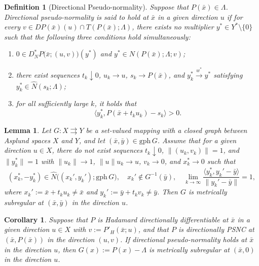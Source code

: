 \documentclass[10pt,a4paper]{amsart}
\newtheorem{lemma}{Lemma}
\newtheorem{definition}{Definition}
\newtheorem{corollary}{Corollary}
\begin{document}
\begin{definition}[Directional Pseudo-normality] \label{defn:directional_pseudo_normality} 
    Suppose that $P(\bar{x}) \in \Lambda$. Directional pseudo-normality is said to hold at $\bar{x}$ in a given direction $u$ if for every $v \in DP(\bar{x})(u) \cap T(P(\bar{x}); \Lambda)$,  there exists no multiplier $y^* \in Y^* \setminus \{0\}$ such that the following three conditions hold simultaneously:
    \begin{enumerate}
        \item[(i)] $0 \in D_N^* P\big(\bar{x}; (u,v)\big)(y^*)$ and $y^* \in N(P(\bar{x}); \Lambda; v)$;
        \item[(ii)] there exist sequences $t_k \downarrow 0$, $u_k \to u$, $s_k \to P(\bar{x})$, and $y_k^* \xrightarrow{w^*} y^*$ satisfying $y_k^* \in \widehat{N}(s_k; \Lambda)$;
        \item[(iii)] for all sufficiently large $k$, it holds that
        \begin{equation}\label{eq:directional_pseudo_normality}
            \langle y_k^*, P(\bar{x} + t_k u_k) - s_k \rangle > 0.  
        \end{equation}
    \end{enumerate}
\end{definition}

\begin{lemma} \label{lem:sequential_ms_characterization}
Let $G: X \rightrightarrows Y$ be a set-valued mapping with a closed graph between Asplund spaces $X$ and $Y$, and let $(\bar{x}, \bar{y}) \in \mathrm{gph}\, G$. Assume that for a given direction $u \in X$, there do not exist sequences $t_k \downarrow 0$, $\|(u_k, v_k)\| = 1$, and $\|y_k^*\| = 1$ with $\|u_k\| \to 1$, $\|u\|u_k \to u$, $v_k \to 0$, and $x_k^* \to 0$ such that
\begin{equation} \label{eq:sequential_ms_condition}
    (x_k^*, -y_k^*) \in \widehat{N}\big((x_k', y_k'); \mathrm{gph}\, G\big), \quad x_k' \notin G^{-1}(\bar{y}), \quad \lim_{k\to \infty} \frac{\langle y_k^*, y_k' - \bar{y} \rangle}{\|y_k' - \bar{y}\|} = 1,
\end{equation}
where $x_k' := \bar{x} + t_k u_k \neq \bar{x}$ and $y_k' := \bar{y} + t_k v_k \neq \bar{y}$. Then $G$ is metrically subregular at $(\bar{x}, \bar{y})$ in the direction $u$.
\end{lemma}

\begin{corollary} \label{cor:dpn_to_mscq}
    Suppose that $P$ is Hadamard directionally differentiable at $\bar{x}$ in a given direction $u \in X$ with $v:=P'_H(\bar{x};u)$, and that $P$ is directionally PSNC at $(\bar{x},P(\bar{x}))$ in the direction $(u,v)$. If directional pseudo-normality holds at $\bar{x}$ in the direction $u$, then $G(x) := P(x) - \Lambda$ is metrically subregular at $(\bar{x}, 0)$ in the direction $u$. 
\end{corollary}
\end{document}

